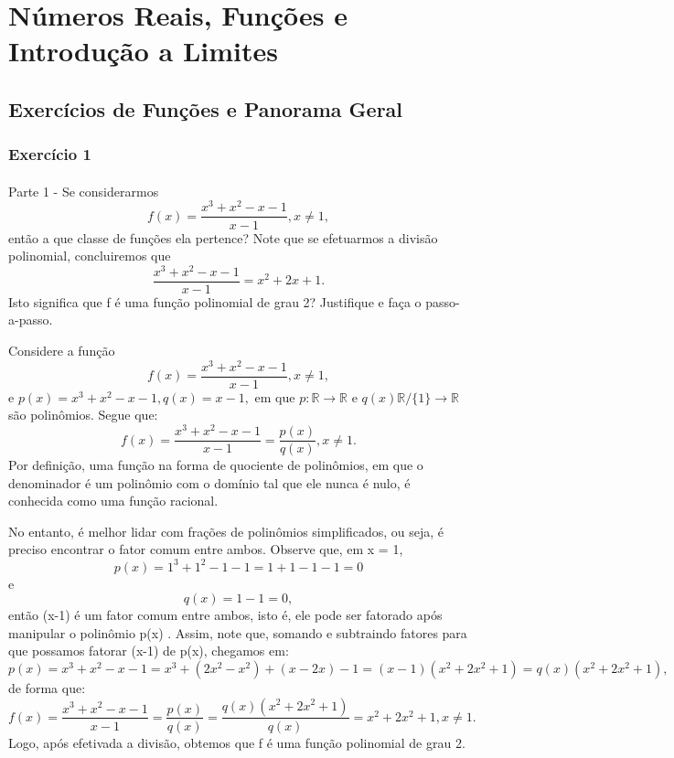\documentclass[Calculus1/exercícios_de_cálculo.tex]{subfiles}
\begin{document}
\section{Números Reais, Funções e Introdução a Limites}
\subsection{Exercícios de Funções e Panorama Geral}
\subsubsection{Exercício 1}
\paragraph{}Parte 1 - Se considerarmos
$$
	f(x) = \frac{x^3 + x^2 - x - 1}{x-1}, x\neq{1},
$$
então a que classe de funções ela pertence? Note que se efetuarmos a divisão polinomial, concluiremos que
$$
	\frac{x^3 + x^2 - x - 1}{x-1} = x^2 + 2x + 1.
$$
Isto significa que f é uma função polinomial de grau 2? Justifique e faça o passo-a-passo.
\begin{proof*}
	Considere a função
	$$
		f(x) = \frac{x^3 + x^2 - x - 1}{x-1}, x\neq{1},
	$$
	e $p(x) = x^3 + x^2 - x - 1, q(x) = x - 1,$ em que $p:\mathbb{R}\rightarrow\mathbb{R}$ e $q(x)\mathbb{R}/\{1\}\rightarrow\mathbb{R}$ são polinômios. Segue que:
	$$
		f(x) = \frac{x^3 + x^2 - x - 1}{x-1} = \frac{p(x)}{q(x)}, x\neq{1}.
	$$
	Por definição, uma função na forma de quociente de polinômios, em que o denominador é um polinômio com o domínio tal que ele nunca é nulo, é conhecida como uma funç\~ao racional.

	No entanto, é melhor lidar com frações de polinômios simplificados, ou seja, é preciso encontrar o fator comum entre ambos. Observe que, em x = 1,
	$$
		p(x) = 1^3 + 1^2 - 1 - 1 = 1 + 1 - 1 - 1 = 0
	$$
	e
	$$
		q(x) = 1 - 1 = 0,
	$$
	então (x-1) é um fator comum entre ambos, isto é, ele pode ser fatorado após manipular o polinômio p(x) . Assim, note que, somando e subtraindo fatores para que possamos fatorar (x-1) de p(x), chegamos em:
	$$
		p(x) = x^3 + x^2 - x - 1 = x^3 + (2x^2 - x^2) +(x - 2x) -1 = (x-1)(x^2 + 2x^2 + 1) = q(x)(x^2 + 2x^2 + 1),
	$$
	de forma que:
	$$
		f(x) = \frac{x^3 + x^2 - x - 1}{x-1} = \frac{p(x)}{q(x)} = \frac{q(x)(x^2 + 2x^2 + 1)}{q(x)} = x^2 + 2x^2 + 1, x\neq{1}.
	$$
	Logo, após efetivada a divisão, obtemos que f é uma função polinomial de grau 2.
	\qedsymbol
\end{proof*}
\end{document}
